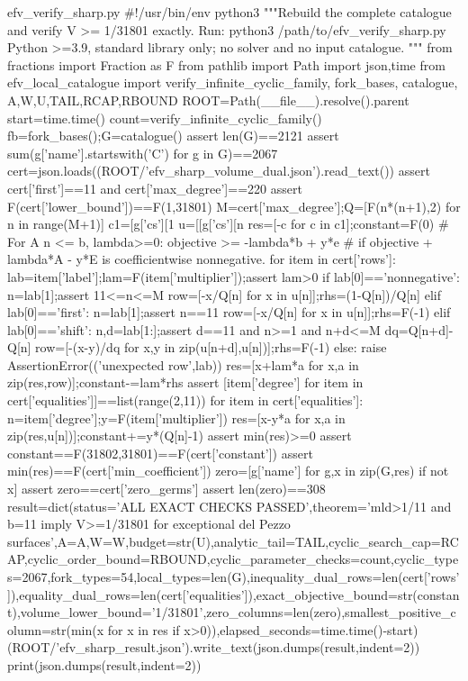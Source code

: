 \documentclass[12pt,a4paper]{article}
\numberwithin{equation}{section}
\theoremstyle{definition}
\begin{document}
\begin{filecontents*}[overwrite]{efv_verify_sharp.py}
#!/usr/bin/env python3
"""Rebuild the complete catalogue and verify V >= 1/31801 exactly.
Run: python3 /path/to/efv_verify_sharp.py
Python >=3.9, standard library only; no solver and no input catalogue.
"""
from fractions import Fraction as F
from pathlib import Path
import json,time
from efv_local_catalogue import verify_infinite_cyclic_family, fork_bases, catalogue, A,W,U,TAIL,RCAP,RBOUND
ROOT=Path(__file__).resolve().parent
start=time.time()
count=verify_infinite_cyclic_family()
fb=fork_bases();G=catalogue()
assert len(G)==2121
assert sum(g['name'].startswith('C') for g in G)==2067
cert=json.loads((ROOT/'efv_sharp_volume_dual.json').read_text())
assert cert['first']==11 and cert['max_degree']==220
assert F(cert['lower_bound'])==F(1,31801)
M=cert['max_degree'];Q=[F(n*(n+1),2) for n in range(M+1)]
c1=[g['cs'][1%
u=[[g['cs'][n%
res=[-c for c in c1];constant=F(0)
# For A n <= b, lambda>=0: objective >= -lambda*b + y*e
# if objective + lambda*A - y*E is coefficientwise nonnegative.
for item in cert['rows']:
 lab=item['label'];lam=F(item['multiplier']);assert lam>0
 if lab[0]=='nonnegative':
  n=lab[1];assert 11<=n<=M
  row=[-x/Q[n] for x in u[n]];rhs=(1-Q[n])/Q[n]
 elif lab[0]=='first':
  n=lab[1];assert n==11
  row=[-x/Q[n] for x in u[n]];rhs=F(-1)
 elif lab[0]=='shift':
  n,d=lab[1:];assert d==11 and n>=1 and n+d<=M
  dq=Q[n+d]-Q[n]
  row=[-(x-y)/dq for x,y in zip(u[n+d],u[n])];rhs=F(-1)
 else:
  raise AssertionError(('unexpected row',lab))
 res=[x+lam*a for x,a in zip(res,row)];constant-=lam*rhs
assert [item['degree'] for item in cert['equalities']]==list(range(2,11))
for item in cert['equalities']:
 n=item['degree'];y=F(item['multiplier'])
 res=[x-y*a for x,a in zip(res,u[n])];constant+=y*(Q[n]-1)
assert min(res)>=0
assert constant==F(31802,31801)==F(cert['constant'])
assert min(res)==F(cert['min_coefficient'])
zero=[g['name'] for g,x in zip(G,res) if not x]
assert zero==cert['zero_germs']
assert len(zero)==308
result=dict(status='ALL EXACT CHECKS PASSED',theorem='mld>1/11 and b=11 imply V>=1/31801 for exceptional del Pezzo surfaces',A=A,W=W,budget=str(U),analytic_tail=TAIL,cyclic_search_cap=RCAP,cyclic_order_bound=RBOUND,cyclic_parameter_checks=count,cyclic_types=2067,fork_types=54,local_types=len(G),inequality_dual_rows=len(cert['rows']),equality_dual_rows=len(cert['equalities']),exact_objective_bound=str(constant),volume_lower_bound='1/31801',zero_columns=len(zero),smallest_positive_column=str(min(x for x in res if x>0)),elapsed_seconds=time.time()-start)
(ROOT/'efv_sharp_result.json').write_text(json.dumps(result,indent=2))
print(json.dumps(result,indent=2))
\end{filecontents*}
\end{document}
